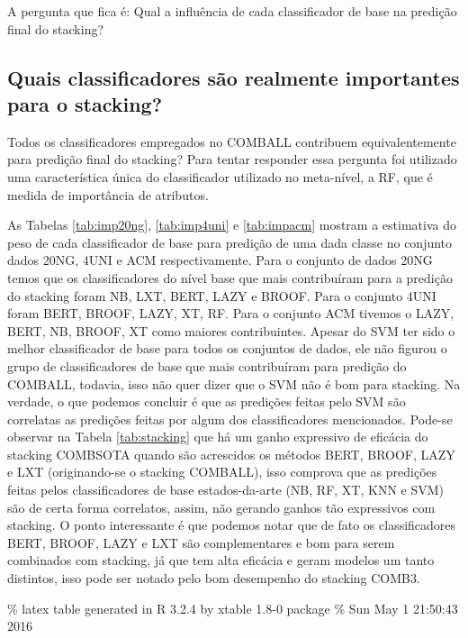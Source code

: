 \documentclass[]{article}
\begin{document}
A pergunta que fica é: Qual a influência de cada classificador de base
na predição final do stacking?

\subsection{Quais classificadores são realmente importantes para o
stacking?}\label{quais-classificadores-sao-realmente-importantes-para-o-stacking}

Todos os classificadores empregados no COMBALL contribuem
equivalentemente para predição final do stacking? Para tentar responder
essa pergunta foi utilizado uma característica única do classificador
utilizado no meta-nível, a RF, que é medida de importância de atributos.

As Tabelas \ref{tab:imp20ng}, \ref{tab:imp4uni} e \ref{tab:impacm}
mostram a estimativa do peso de cada classificador de base para predição
de uma dada classe no conjunto dados 20NG, 4UNI e ACM respectivamente.
Para o conjunto de dados 20NG temos que os classificadores do nível base
que mais contribuíram para a predição do stacking foram NB, LXT, BERT,
LAZY e BROOF. Para o conjunto 4UNI foram BERT, BROOF, LAZY, XT, RF. Para
o conjunto ACM tivemos o LAZY, BERT, NB, BROOF, XT como maiores
contribuintes. Apesar do SVM ter sido o melhor classificador de base
para todos os conjuntos de dados, ele não figurou o grupo de
classificadores de base que mais contribuíram para predição do COMBALL,
todavia, isso não quer dizer que o SVM não é bom para stacking. Na
verdade, o que podemos concluir é que as predições feitas pelo SVM são
correlatas as predições feitas por algum dos classificadores
mencionados. Pode-se observar na Tabela \ref{tab:stacking} que há um
ganho expressivo de eficácia do stacking COMBSOTA quando são acrescidos
os métodos BERT, BROOF, LAZY e LXT (originando-se o stacking COMBALL),
isso comprova que as predições feitas pelos classificadores de base
estados-da-arte (NB, RF, XT, KNN e SVM) são de certa forma correlatos,
assim, não gerando ganhos tão expressivos com stacking. O ponto
interessante é que podemos notar que de fato os classificadores BERT,
BROOF, LAZY e LXT são complementares e bom para serem combinados com
stacking, já que tem alta eficácia e geram modelos um tanto distintos,
isso pode ser notado pelo bom desempenho do stacking COMB3.

\% latex table generated in R 3.2.4 by xtable 1.8-0 package \% Sun May 1
21:50:43 2016
\end{document}
